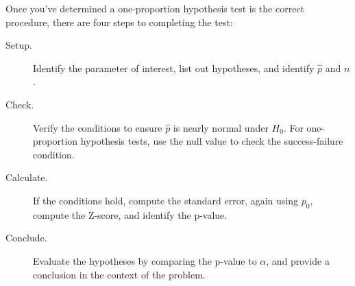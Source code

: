 
\begin{termBox}{
  Once you've determined a one-proportion hypothesis test is the
  correct procedure, there are four steps to completing the
  test:
  \begin{description}
  \item[Setup.]
      Identify the parameter of interest,
      list out hypotheses,
      and identify $\hat{p}$ and $n$.
  \item[Check.] Verify the conditions
      to ensure $\hat{p}$ is nearly normal under $H_0$.
      For one-proportion hypothesis tests, use the null
      value to check the success-failure condition.
  \item[Calculate.] If the conditions hold, compute the standard
      error, again using $p_0$, compute the Z-score,
      and identify the p-value.
  \item[Conclude.] Evaluate the hypotheses by comparing the p-value
      to $\alpha$, and provide a conclusion in the context of the
      problem.
  \end{description}}
\end{termBox}






